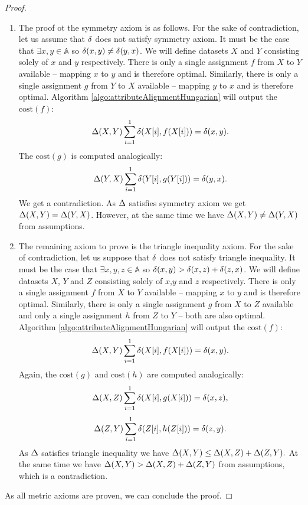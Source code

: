 \begin{theorem}
\begin{proof}
\begin{enumerate}
\begin{itemize}
			\end{itemize}
			\item The proof ot the symmetry axiom is as follows. For the sake of contradiction, let us assume that $\delta$ does not satisfy symmetry axiom. It must be the case that $\exists x,y \in \mathbb{A}$ so $\delta(x,y) \ne \delta(y,x)$. We will define datasets $X$ and $Y$ consisting solely of $x$ and $y$ respectively. There is only a single assignment $f$ from $X$ to $Y$ available -- mapping $x$ to $y$ and is therefore optimal. Similarly, there is only a single assignment $g$ from $Y$ to $X$ available -- mapping $y$ to $x$ and is therefore optimal. Algorithm \ref{algo:attributeAlignmentHungarian} will output the $\text{cost}(f)$:  
			$$\Delta(X,Y)\sum_{i=1}^{1}\delta(X[i],f(X[i]))=\delta(x,y).$$
			The $\text{cost}(g)$ is computed analogically: $$\Delta(Y,X)\sum_{i=1}^{1}\delta(Y[i],g(Y[i]))=\delta(y,x).$$ 
			We get a contradiction. As $\Delta$ satisfies symmetry axiom we get $\Delta(X,Y) = \Delta(Y,X)$. However, at the same time we have $\Delta(X,Y) \ne \Delta(Y,X)$ from assumptions.
			\item The remaining axiom to prove is the triangle inequality axiom. For the sake of contradiction, let us suppose that $\delta$ does not satisfy triangle inequality. It must be the case that $\exists x,y,z \in \mathbb{A}$ so $\delta(x,y) > \delta(x,z)+\delta(z,x)$. We will  define datasets $X$, $Y$ and $Z$ consisting solely of $x$,$y$ and $z$ respectively. There is only a single assignment $f$ from $X$ to $Y$ available -- mapping $x$ to $y$ and is therefore optimal. Similarly, there is only a single assignment $g$ from $X$ to $Z$ available and only a single assignment $h$ from $Z$ to $Y$ -- both are also optimal. Algorithm \ref{algo:attributeAlignmentHungarian} will output the $\text{cost}(f)$:
			$$\Delta(X,Y)\sum_{i=1}^{1}\delta(X[i],f(X[i]))=\delta(x,y).$$
			Again, the $\text{cost}(g)$ and $\text{cost}(h)$ are computed analogically:
			\begin{equation*}
			\Delta(X,Z)\sum_{i=1}^{1}\delta(X[i],g(X[i]))=\delta(x,z),
			\end{equation*}
			\begin{equation*}
			\Delta(Z,Y)\sum_{i=1}^{1}\delta(Z[i],h(Z[i]))=\delta(z,y).
			\end{equation*}
			 As $\Delta$ satisfies triangle inequality we have $\Delta(X,Y) \le \Delta(X,Z)+\Delta(Z,Y).$ At the same time we have $\Delta(X,Y) > \Delta(X,Z)+\Delta(Z,Y)$ from assumptions, which is a contradiction.
		\end{enumerate}
			As all metric axioms are proven, we can conclude the proof.	
		\end{proof}	
\end{theorem}

